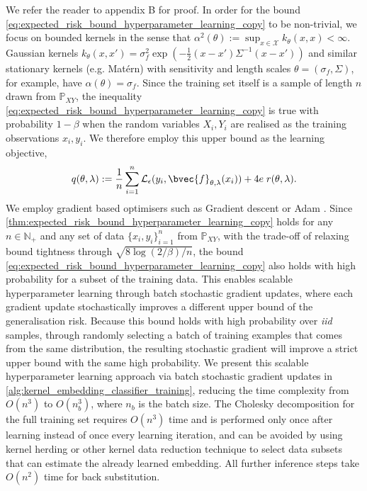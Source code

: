 \documentclass{article}
\begin{document}
	We refer the reader to appendix B for proof. In order for the bound \eqref{eq:expected_risk_bound_hyperparameter_learning_copy} to be non-trivial, we focus on bounded kernels in the sense that $\alpha^{2}(\theta) := \sup_{x \in \mathcal{X}} k_{\theta}(x, x) < \infty$. Gaussian kernels $k_{\theta}(x, x') = \sigma_{f}^{2} \exp{( - \frac{1}{2}(x - x') \Sigma^{-1} (x - x') )}$ and similar stationary kernels (e.g. Mat\'{e}rn) with sensitivity and length scales $\theta = (\sigma_{f}, \Sigma)$, for example, have $\alpha(\theta) = \sigma_{f}$. Since the training set itself is a sample of length $n$ drawn from $\mathbb{P}_{X Y}$, the inequality \eqref{eq:expected_risk_bound_hyperparameter_learning_copy} is true with probability $1 - \beta$ when the random variables $X_{i}, Y_{i}$ are realised as the training observations $x_{i}, y_{i}$. We therefore employ this upper bound as the learning objective,
	\begin{equation}
		q(\theta, \lambda) := \frac{1}{n} \sum_{i = 1}^{n} \mathcal{L}_{\epsilon}(y_{i}, \bvec{f}_{\theta, \lambda}(x_{i})) + 4 e \; r(\theta, \lambda).
	\label{eq:learning_objective}
	\end{equation}
	We employ gradient based optimisers such as Gradient descent or Adam \citep{kingma2014adam}. Since \cref{thm:expected_risk_bound_hyperparameter_learning_copy} holds for any $n \in \mathbb{N}_{+}$ and any set of data $\{x_{i}, y_{i}\}_{i = 1}^{n}$ from $\mathbb{P}_{X Y}$, with the trade-off of relaxing bound tightness through $\sqrt{8 \log{(2 / \beta)} / n}$, the bound \eqref{eq:expected_risk_bound_hyperparameter_learning_copy} also holds with high probability for a subset of the training data. This enables scalable hyperparameter learning through batch stochastic gradient updates, where each gradient update stochastically improves a different upper bound of the generalisation risk. Because this bound holds with high probability over \textit{iid} samples, through randomly selecting a batch of training examples that comes from the same distribution, the resulting stochastic gradient will improve a strict upper bound with the same high probability. We present this scalable hyperparameter learning approach via batch stochastic gradient updates in \cref{alg:kernel_embedding_classifier_training}, reducing the time complexity from $O(n^{3})$ to $O(n_{b}^{3})$, where $n_{b}$ is the batch size. The Cholesky decomposition for the full training set requires $O(n^{3})$ time and is performed only once after learning instead of once every learning iteration, and can be avoided by using kernel herding \citep{chen2010super} or other kernel data reduction technique to select data subsets that can estimate the already learned embedding. All further inference steps take $O(n^{2})$ time for back substitution. 
	
\end{document}
